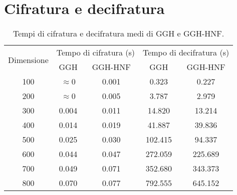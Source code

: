 \section{Cifratura e decifratura}
\label{sec:risultati_cifratura_decifratura}

\begin{table}[htbp]
    \centering
    \begin{tabular}{|c|c|c|c|c|}
        \hline
        \multirow{2}{*}{Dimensione} & 
        \multicolumn{2}{c|}{Tempo di cifratura (s)} & 
        \multicolumn{2}{c|}{Tempo di decifratura (s)} \\
        \cline{2-5}
        & GGH & GGH-HNF & GGH & GGH-HNF \\
        \hline
        100 & $\approx$0 & 0.001 & 0.323 & 0.227 \\
        200 & $\approx$0 & 0.005 & 3.787 & 2.979 \\
        300 & 0.004 & 0.011 & 14.820 & 13.214 \\
        400 & 0.014 & 0.019 & 41.887 & 39.836 \\
        500 & 0.025 & 0.030 & 102.415 & 94.337 \\
        600 & 0.044 & 0.047 & 272.059 & 225.689 \\
        700 & 0.049 & 0.071 & 352.680 & 343.373 \\
        800 & 0.070 & 0.077 & 792.555 & 645.152 \\
        \hline
    \end{tabular}
    \caption{Tempi di cifratura e decifratura medi di GGH e GGH-HNF.}
    \label{tab:enc_dec_comparison}
\end{table}

